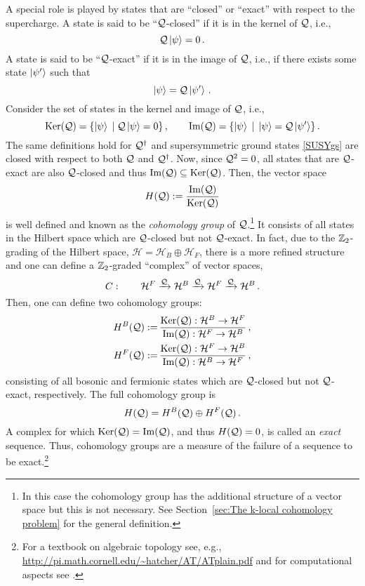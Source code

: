 \documentclass[11pt]{article}
\numberwithin{equation}{section}
\def\cQ{{\cal Q}}
\newcommand\equ[1] {\begin{equation}#1\end{equation}}
\newcommand\eqs[1] {\begin{align}#1\end{align}}
\renewcommand\( {\left(}
\renewcommand\) {\right)}
\def\cH{\mathcal H}
\begin{document}
A special role is played by states that are ``closed'' or ``exact'' with respect to the supercharge. A state is said to be ``$\cQ$-closed'' if it is in the kernel of $\cQ$, i.e.,
\equ{
    \cQ\ket{\psi} = 0\,.
}
A state is said to be ``$\cQ$-exact'' if it is in the image of $\cQ$, i.e., if there exists some state $\ket{\psi'}$ such that 
\equ{
    \ket{\psi} = \cQ\ket{\psi'}\,.
}
Consider the set of states in the kernel and image of $\cQ$, i.e., 
\equ{
\text{Ker}(\cQ)= \{\ket{\psi}\;|\; \cQ\ket{\psi}=0\}\,,\qquad \text{Im}(\cQ)= \{\ket{\psi}\;|\; \ket{\psi}=\cQ\ket{\psi'}\}\,.
}
The same definitions hold  for  $\cQ^{\dagger}$ and supersymmetric ground states \eqref{SUSYgs} are closed with respect to both $\cQ$ and $\cQ^{\dagger}$. Now, since $\cQ^{2}=0$, all states that are $\cQ$-exact are also $\cQ$-closed and thus $\text{Im}(\cQ)\subseteq\text{Ker}(\cQ)$. Then, the  vector space 
\equ{
H(\cQ):= \frac{\text{Im}(\cQ)}{\text{Ker}(\cQ)}
} 
is well defined and known as the {\it cohomology group} of $\cQ$.\footnote{In this case the cohomology group has the additional structure of a vector space but this is not necessary. See Section~\ref{sec:The k-local cohomology problem} for the general definition. }  It consists of all states in the Hilbert space which are $\cQ$-closed but not $\cQ$-exact. In fact, due to the $\Bbb Z_{2}$-grading of the Hilbert space, $\cH=\cH_{B}\oplus \cH_{F}$, there is a more refined structure and one can define a $\Bbb Z_{2}$-graded ``complex''  of vector spaces,
\equ{\label{complexBF}
C: \qquad \cH^{F}\xrightarrow{\cQ}\cH^{B}\xrightarrow{\cQ}\cH^{F}\xrightarrow{\cQ}\cH^{B}\,.
}
Then, one can define two cohomology groups:
\eqs{
H^{B}(\cQ):=\,& \frac{\text{Ker}(\cQ): \cH^{B}\to \cH^{F}}{\text{Im}(\cQ): \cH^{F}\to \cH^{B}}\,,\\ 
H^{F}(\cQ):=\,& \frac{\text{Ker}(\cQ): \cH^{F}\to \cH^{B}}{\text{Im}(\cQ): \cH^{B}\to \cH^{F}}\,,
}
consisting of all bosonic and fermionic states which are $\cQ$-closed but not $\cQ$-exact, respectively. The full cohomology group is 
\equ{
H(\cQ)=H^{B}(\cQ)\oplus H^{F}(\cQ)\,.
} 
A  complex for which $\text{Ker}(\cQ)=\Im(\cQ)$, and thus $H(\cQ)=0$,  is called an {\it exact} sequence. Thus, cohomology groups are a measure of the failure of a  sequence to be exact.\footnote{For a textbook on algebraic topology see, e.g., \url{http://pi.math.cornell.edu/~hatcher/AT/ATplain.pdf} and for computational aspects see \cite{CompTopBook,zomorodian_2005}.}
\end{document}
